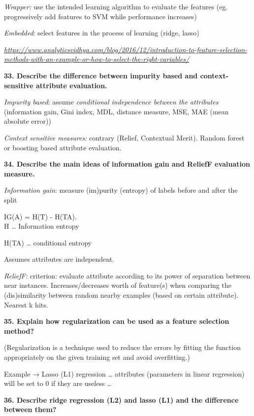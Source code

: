 \textit{Wrapper:} use the intended learning algorithm to evaluate the
features (eg. progressively add features to SVM while performance
increases)

\textit{Embedded}: select features in the process of learning (ridge,
lasso)

\href{https://www.analyticsvidhya.com/blog/2016/12/introduction-to-feature-selection-methods-with-an-example-or-how-to-select-the-right-variables/}{\textit{https://www.analyticsvidhya.com/blog/2016/12/introduction-to-feature-selection-methods-with-an-example-or-how-to-select-the-right-variables/}}

\textbf{33. Describe the difference between impurity based and
context-sensitive attribute evaluation.}

\textit{Impurity based}: assume \emph{conditional independence
between the attributes} (information gain, Gini index, MDL, distance
measure, MSE, MAE (mean absolute error))

\textit{Context sensitive measures:} contrary (Relief, Contextual
Merit). Random forest or boosting based attribute evaluation.

\textbf{34. Describe the main ideas of information gain and ReliefF
evaluation measure.}

\textit{Information gain}: measure (im)purity (entropy) of labels
before and after the split

IG(A) = H(T) - H(T\textbar A).\\
H \ldots{} Information entropy

H(T\textbar A) \ldots{} conditional entropy

Assumes attributes are independent.

\textit{ReliefF:} criterion: evaluate attribute according to its
power of separation between near instances. Increases/decreases worth of
feature(s) when comparing the (dis)similarity between random nearby
examples (based on certain attribute). Nearest k hits.

\textbf{35. Explain how regularization can be used as a feature
selection method?}

(Regularization is a technique used to reduce the errors by fitting the
function appropriately on the given training set and avoid overfitting.)

Example → Lasso (L1) regression \ldots{} attributes (parameters in
linear regression) will be set to 0 if they are useless \ldots{}

\textbf{36. Describe ridge regression (L2) and lasso (L1) and the
difference between them?}

